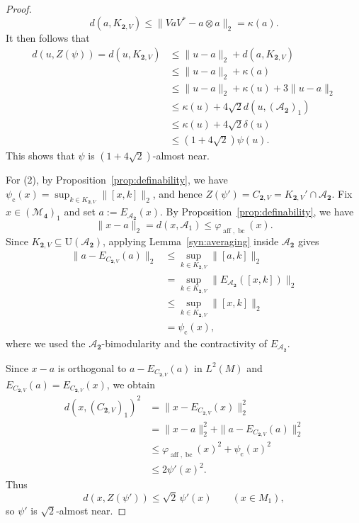 \documentclass[12pt]{amsart}
\numberwithin{equation}{section}
\theoremstyle{definition}
\def\M{\mathcal{M}}
\def \M{\mathcal{M}}
\def \A{\mathcal{A}}
\begin{document}
\begin{proof}
\[d(a,K_{\mathbf{2},V})\le \|VaV^*-a\otimes a\|_2=\kappa(a).\]
It then follows that 
\begin{align*}
d(u,Z(\psi))=d(u,K_{\mathbf{2},V})&\le \|u-a\|_2+d(a,K_{\mathbf{2},V})\\
&\le \|u-a\|_2+\kappa(a)\\
&\le \|u-a\|_2+\kappa(u)+3\|u-a\|_2\\
&\le \kappa(u)+4\sqrt{2}d(u,(\A_{\mathbf{2}})_1)\\
&\le \kappa(u)+4\sqrt{2}\delta(u)\\
&\le (1+4\sqrt{2})\psi(u).
\end{align*}
This shows that $\psi$ is $(1+4\sqrt{2})$-almost near.

For (2), by Proposition~\ref{prop:definability}, we have $\psi_{\operatorname{c}}(x)=\sup_{k\in K_{\mathbf{2},V}}\|[x,k]\|_2$, 
and hence $Z(\psi')=C_{\mathbf{2},V}=K_{\mathbf{2},V}'\cap \A_{\mathbf{2}}$. 
Fix $x\in (\M_{\mathbf{4}})_1$ and set $a:=E_{\A_{\mathbf{2}}}(x)$.
By Proposition~\ref{prop:definability}, we have
\[
\|x-a\|_2=d(x,\A_1)
\leq\varphi_{\operatorname{aff},\operatorname{bc}}(x).
\]
Since $K_{\mathbf{2},V}\subseteq \mathrm{U}(\A_{\mathbf{2}})$, applying
Lemma~\ref{syn:averaging} inside $\A_{\mathbf{2}}$ gives
\[
\begin{aligned}
\|a-E_{C_{\mathbf{2},V}}(a)\|_2
&\leq \sup_{k\in K_{\mathbf{2},V}}\|[a,k]\|_2\\
&=\sup_{k\in K_{\mathbf{2},V}}\|E_{\A_{\mathbf{2}}}([x,k])\|_2\\
&\leq\sup_{k\in K_{\mathbf{2},V}}\|[x,k]\|_2\\
&=\psi_{\operatorname{c}}(x),
\end{aligned}
\]
where we used the $\A_{\mathbf{2}}$-bimodularity and
the contractivity of $E_{\A_{\mathbf{2}}}$.

Since $x-a$ is orthogonal to $a-E_{C_{\mathbf{2},V}}(a)$
in $L^2(M)$ and $E_{C_{\mathbf{2},V}}(a)=E_{C_{\mathbf{2},V}}(x)$,
we obtain
\[
\begin{aligned}
d(x,(C_{\mathbf{2},V})_1)^2
&=\|x-E_{C_{\mathbf{2},V}}(x)\|_2^2\\
&=\|x-a\|_2^2+\|a-E_{C_{\mathbf{2},V}}(a)\|_2^2\\
&\leq
\varphi_{\operatorname{aff},\operatorname{bc}}(x)^2
+\psi_{\operatorname{c}}(x)^2\\
&\leq 2\psi'(x)^2.
\end{aligned}
\]
Thus
\[
d(x,Z(\psi'))\leq\sqrt{2}\,\psi'(x)
\qquad(x\in M_1),
\]
so $\psi'$ is $\sqrt{2}$-almost near.
\end{proof}
\end{document}
